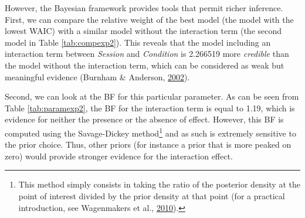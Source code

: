 \documentclass[a4paper,12pt,twoside,openright,oldfontcommands,final]{memoir}
\let\rmarkdownfootnote\footnote%
\def\footnote{\protect\rmarkdownfootnote}
\begin{document}
However, the Bayesian framework provides tools that permit richer inference. First, we can compare the relative weight of the best model (the model with the lowest WAIC) with a similar model without the interaction term (the second model in Table \ref{tab:compexp2}). This reveals that the model including an interaction term between \emph{Session} and \emph{Condition} is 2.266519 more \emph{credible} than the model without the interaction term, which can be considered as weak but meaningful evidence (Burnham \& Anderson, \protect\hyperlink{ref-burnham_model_2002}{2002}).

Second, we can look at the BF for this particular parameter. As can be seen from Table \ref{tab:paramexp2}, the BF for the interaction term is equal to 1.19, which is evidence for neither the presence or the absence of effect. However, this BF is computed using the Savage-Dickey method\footnote{This method simply consists in taking the ratio of the posterior density at the point of interest divided by the prior density at that point (for a practical introduction, see Wagenmakers et al., \protect\hyperlink{ref-wagenmakers_bayesian_2010}{2010}).} and as such is extremely sensitive to the prior choice. Thus, other priors (for instance a prior that is more peaked on zero) would provide stronger evidence for the interaction effect.
\end{document}
